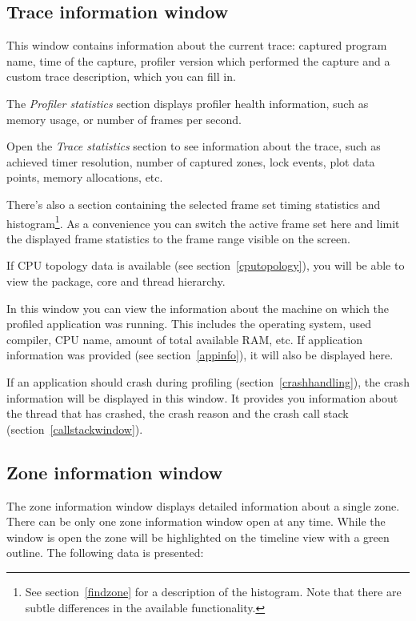 \documentclass[hidelinks,titlepage,a4paper]{article}
\begin{document}
\subsection{Trace information window}
\label{traceinfo}

This window contains information about the current trace: captured program name, time of the capture, profiler version which performed the capture and a custom trace description, which you can fill in.

The \emph{Profiler statistics} section displays profiler health information, such as memory usage, or number of frames per second.

Open the \emph{Trace statistics} section to see information about the trace, such as achieved timer resolution, number of captured zones, lock events, plot data points, memory allocations, etc.

There's also a section containing the selected frame set timing statistics and histogram\footnote{See section~\ref{findzone} for a description of the histogram. Note that there are subtle differences in the available functionality.}. As a convenience you can switch the active frame set here and limit the displayed frame statistics to the frame range visible on the screen.

If CPU topology data is available (see section~\ref{cputopology}), you will be able to view the package, core and thread hierarchy.

In this window you can view the information about the machine on which the profiled application was running. This includes the operating system, used compiler, CPU name, amount of total available RAM, etc. If application information was provided (see section~\ref{appinfo}), it will also be displayed here.

If an application should crash during profiling (section~\ref{crashhandling}), the crash information will be displayed in this window. It provides you information about the thread that has crashed, the crash reason and the crash call stack (section~\ref{callstackwindow}).

\subsection{Zone information window}
\label{zoneinfo}

The zone information window displays detailed information about a single zone. There can be only one zone information window open at any time. While the window is open the zone will be highlighted on the timeline view with a green outline. The following data is presented:
\end{document}
